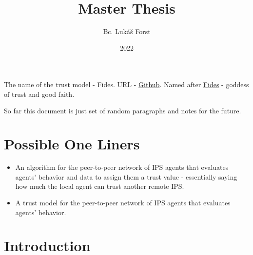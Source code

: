 \documentclass{article}
\title{Master Thesis}
\author{Bc. Lukáš Forst}
\date{2022}
\begin{document}
\maketitle

The name of the trust model - Fides. URL - \href{https://github.com/LukasForst/fides}{Github}.
Named after \href{https://en.wikipedia.org/wiki/Fides_(deity)}{Fides} - goddess of trust and good faith.

So far this document is just set of random paragraphs and notes for the future.

\section{Possible One Liners}
\begin{itemize}
\item An algorithm for the peer-to-peer network of IPS agents that evaluates agents’ behavior and data to assign them a trust value - essentially saying how much the local agent can trust another remote IPS.
\item A trust model for the peer-to-peer network of IPS agents that evaluates agents’ behavior.
\end{itemize}





\section{Introduction}


\end{document}
